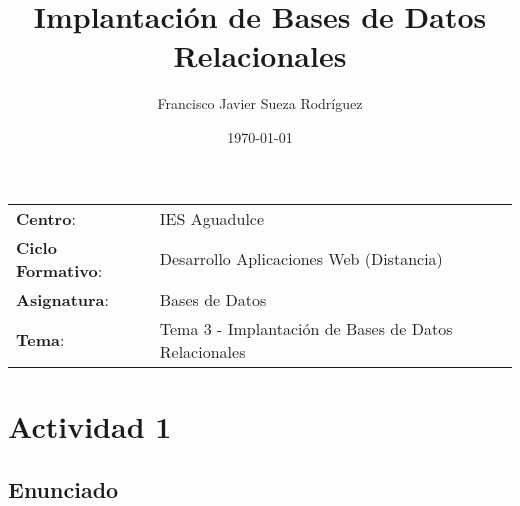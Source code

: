 


\title{
\normalfont \normalsize
\huge \textbf{Implantación de Bases de Datos Relacionales}
}
\author{Francisco Javier Sueza Rodríguez}
\date{\normalsize\today}



\maketitle

\vspace{2ex}

\begin{center}
    \begin{tabular}{l l}
        \textbf{Centro}: & IES Aguadulce \\
        \textbf{Ciclo Formativo}: & Desarrollo Aplicaciones Web (Distancia)\\
        \textbf{Asignatura}: & Bases de Datos\\
        \textbf{Tema}: & Tema 3 - Implantación de Bases de Datos Relacionales \\
    \end{tabular}
\end{center}

\vspace{10ex}

\tableofcontents

\section{Actividad 1}
\subsection{Enunciado}




\newpage



